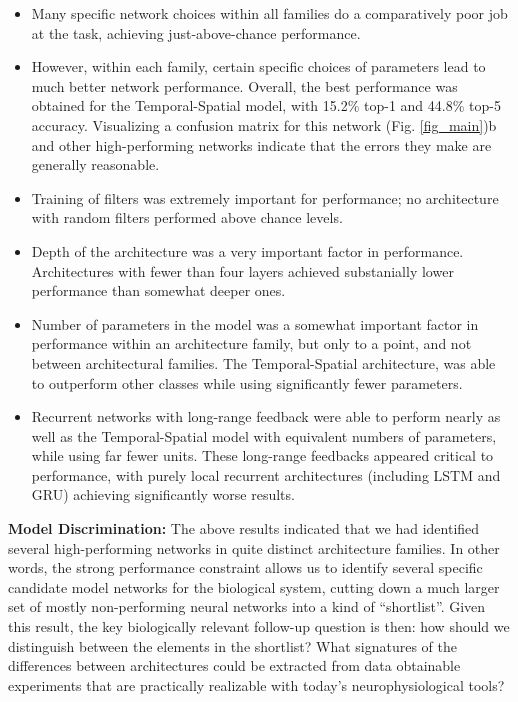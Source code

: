 \begin{itemize}[leftmargin=*,itemsep=0ex,topsep=1ex]
   \item Many specific network choices within all families do a comparatively poor job at the task, achieving just-above-chance performance.
   \item However, within each family, certain specific choices of parameters lead to much better network performance.
   Overall, the best performance was obtained for the Temporal-Spatial model, with 15.2\% top-1 and 44.8\% top-5 accuracy.
   Visualizing a confusion matrix for this network (Fig. \ref{fig_main})b  and other high-performing networks indicate that the errors they make are generally reasonable.
   \item Training of filters was extremely important for performance; no architecture with random filters performed above chance levels.
   \item Depth of the architecture was a very important factor in performance. Architectures with fewer than four layers achieved substanially lower performance than somewhat deeper ones.
   \item Number of parameters in the model was a somewhat important factor in performance within an architecture family, but only to a point, and not between architectural families.
   The Temporal-Spatial architecture, was able to outperform other classes while using significantly fewer parameters.
   \item Recurrent networks with long-range feedback were able to perform nearly as well as the Temporal-Spatial model with equivalent numbers of parameters, while using far fewer units.
   These long-range feedbacks appeared critical to performance, with purely local recurrent architectures (including LSTM and GRU) achieving significantly worse results.
\end{itemize}

\textbf{Model Discrimination:}  The above results indicated that we had identified several high-performing networks in quite distinct architecture families.
In other words, the strong performance constraint allows us to identify several specific candidate model networks for the biological system, cutting down a much larger set of mostly non-performing neural networks into a kind of ``shortlist''.
Given this result, the key biologically relevant follow-up question is then: how should we distinguish between the elements in the shortlist?
What signatures of the differences between architectures could be extracted from data obtainable experiments that are practically realizable with today's neurophysiological tools?

